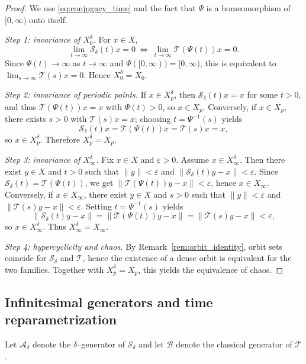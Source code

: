 \documentclass[preprint,12pt]{elsarticle}
\newtheorem{proof}{Proof}
\begin{document}
\begin{proof}
We use \eqref{eq:conjugacy_time} and the fact that $\Psi$ is a homeomorphism of
$[0,\infty)$ onto itself.

\smallskip
\noindent\emph{Step 1: invariance of $X_0^\delta$.}
For $x\in X$,
\[
\lim_{t\to\infty}\mathcal S_\delta(t)x=0
\ \Longleftrightarrow\
\lim_{t\to\infty}\mathcal T(\Psi(t))x=0.
\]
Since $\Psi(t)\to\infty$ as $t\to\infty$ and $\Psi([0,\infty))=[0,\infty)$,
this is equivalent to $\lim_{s\to\infty}\mathcal T(s)x=0$.
Hence $X_0^\delta=X_0$.

\smallskip
\noindent\emph{Step 2: invariance of periodic points.}
If $x\in X_p^\delta$, then $\mathcal S_\delta(t)x=x$ for some $t>0$, and thus
$\mathcal T(\Psi(t))x=x$ with $\Psi(t)>0$, so $x\in X_p$.
Conversely, if $x\in X_p$, there exists $s>0$ with $\mathcal T(s)x=x$; choosing
$t=\Psi^{-1}(s)$ yields
\[
\mathcal S_\delta(t)x=\mathcal T(\Psi(t))x=\mathcal T(s)x=x,
\]
so $x\in X_p^\delta$.
Therefore $X_p^\delta=X_p$.

\smallskip
\noindent\emph{Step 3: invariance of $X_\infty^\delta$.}
Fix $x\in X$ and $\varepsilon>0$.
Assume $x\in X_\infty^\delta$. Then there exist $y\in X$ and $t>0$ such that
$\|y\|<\varepsilon$ and $\|\mathcal S_\delta(t)y-x\|<\varepsilon$.
Since $\mathcal S_\delta(t)=\mathcal T(\Psi(t))$, we get
$\|\mathcal T(\Psi(t))y-x\|<\varepsilon$, hence $x\in X_\infty$.
Conversely, if $x\in X_\infty$, there exist $y\in X$ and $s>0$ such that
$\|y\|<\varepsilon$ and $\|\mathcal T(s)y-x\|<\varepsilon$.
Setting $t=\Psi^{-1}(s)$ yields
\[
\|\mathcal S_\delta(t)y-x\|
=
\|\mathcal T(\Psi(t))y-x\|
=
\|\mathcal T(s)y-x\|
<\varepsilon,
\]
so $x\in X_\infty^\delta$.
Thus $X_\infty^\delta=X_\infty$.

\smallskip
\noindent\emph{Step 4: hypercyclicity and chaos.}
By Remark~\ref{rem:orbit_identity}, orbit sets coincide for $\mathcal S_\delta$ and
$\mathcal T$, hence the existence of a dense orbit is equivalent for the two families.
Together with $X_p^\delta=X_p$, this yields the equivalence of chaos.
\end{proof}

\subsection{Infinitesimal generators and time reparametrization}

Let $\mathcal A_\delta$ denote the $\delta$--generator of $\mathcal S_\delta$ and let
$\mathcal B$ denote the classical generator of $\mathcal T$.
\end{document}
